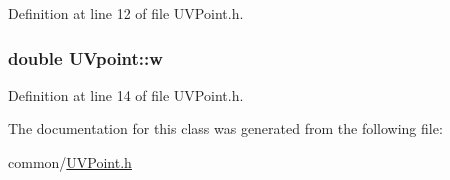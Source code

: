 Definition at line 12 of file UVPoint.h.

\hypertarget{classUVpoint_a63806cfcf5064f6b87618d4fcd389f01}{
\subsubsection[{w}]{\setlength{\rightskip}{0pt plus 5cm}double {\bf UVpoint::w}}}
\label{classUVpoint_a63806cfcf5064f6b87618d4fcd389f01}


Definition at line 14 of file UVPoint.h.



The documentation for this class was generated from the following file:\begin{DoxyCompactItemize}
\item 
common/\hyperlink{UVPoint_8h}{UVPoint.h}\end{DoxyCompactItemize}
